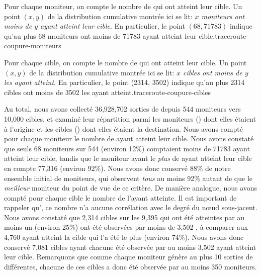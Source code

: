  {Pour chaque moniteur, on compte le nombre de \traceroute qui ont atteint leur
cible. Un point $(x, y)$ de la distribution cumulative montrée ici se lit: {\em
$x$ moniteurs ont moins de $y$ \traceroute ayant atteint leur cible}. En
particulier, le point $(68, 71783)$ indique qu'au plus 68 moniteurs ont moins de
71783 \traceroute ayant atteint leur cible.}{traceroute-coupure-moniteurs}

{Pour chaque cible, on compte le nombre de \traceroute qui ont atteint leur
cible. Un point $(x, y)$ de la distribution cumulative montrée ici se lit: {\em
$x$ cibles ont moins de $y$ \traceroute les ayant atteint}. En particulier, le
point (2314, 3502) indique qu'au plus 2314 cibles ont moins de 3502 \traceroute
les ayant atteint.}{traceroute-coupure-cibles}

Au total, nous avons collecté 36,928,702 sorties de \traceroute depuis 544
moniteurs vers 10,000 cibles, et examiné leur répartition parmi les moniteurs
() dont elles étaient à l'origine et les
cibles () dont elles étaient la destination.
Nous avons compté pour chaque moniteur le nombre de \traceroute ayant
atteint leur cible. Nous avons constaté que seuls 68 moniteurs sur 544 (environ
12\%) comptaient moins de 71783 \traceroute ayant atteint leur cible, tandis que
le moniteur ayant le {\em plus} de \traceroute ayant atteint leur cible en
compte 77,316 (environ 92\%). Nous avons donc conservé 88\% de notre ensemble
initial de moniteurs, qui observent {\em tous} au moins 92\% autant de
\traceroute que le {\em meilleur} moniteur du point de vue de ce critère. De
manière analogue, nous avons compté pour chaque cible le nombre de \traceroute
l'ayant atteinte. Il est important de rappeler qu'\apriori, ce nombre n'a aucune
corrélation avec le degré du n\oe{}ud \LLL sous-jacent. Nous avons constaté que
2,314 cibles sur les 9,395 qui ont été atteintes par au moins un \traceroute
(environ 25\%) ont été observées par moins de 3,502 \traceroute, à comparer aux
4,760 \traceroute ayant atteint la cible qui l'a été le plus (environ 74\%).
Nous avons donc conservé 7,081 cibles ayant chacune été observée par au moins 3,502
\traceroute ayant atteint leur cible. Remarquons que comme chaque moniteur
génère au plus 10 sorties de \traceroute différentes, chacune de ces cibles a
donc été observée par au moins 350 moniteurs.

